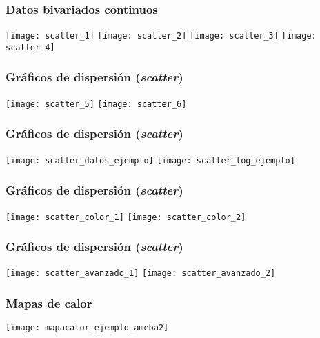 \documentclass[table]{beamer}
\begin{document}
\begin{frame}
    \frametitle{Datos bivariados continuos}
    \begin{center}
        \texttt{[image: scatter\_1]}
        \texttt{[image: scatter\_2]}
        \texttt{[image: scatter\_3]}
        \texttt{[image: scatter\_4]}
    \end{center}
\end{frame}

\begin{frame}
    \frametitle{Gráficos de dispersión (\emph{scatter})}
    \begin{center}
        \texttt{[image: scatter\_5]}
        \texttt{[image: scatter\_6]}
    \end{center}
\end{frame}

\begin{frame}
    \frametitle{Gráficos de dispersión (\emph{scatter})}
    \begin{center}
        \texttt{[image: scatter\_datos\_ejemplo]}
        \texttt{[image: scatter\_log\_ejemplo]}
    \end{center}
\end{frame}

\begin{frame}
    \frametitle{Gráficos de dispersión (\emph{scatter})}
    \begin{center}
        \texttt{[image: scatter\_color\_1]}
        \texttt{[image: scatter\_color\_2]}
    \end{center}
\end{frame}

\begin{frame}
    \frametitle{Gráficos de dispersión (\emph{scatter})}
    \begin{center}
        \texttt{[image: scatter\_avanzado\_1]}
        \texttt{[image: scatter\_avanzado\_2]}
    \end{center}
\end{frame}

\begin{frame}
    \frametitle{Mapas de calor}
    \begin{center}
        \texttt{[image: mapacalor\_ejemplo\_ameba2]}
    \end{center}
\end{frame}
\end{document}

